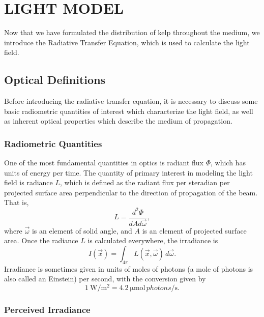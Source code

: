 \chapter{LIGHT MODEL}
\label{chap:light}

Now that we have formulated the distribution of kelp throughout the medium, we introduce the Radiative Transfer Equation, which is used to calculate the light field.

\section{Optical Definitions}
Before introducing the radiative transfer equation, it is necessary to discuss some basic radiometric quantities of interest which characterize the light field, as well as inherent optical properties which describe the medium of propagation.

\subsection{Radiometric Quantities}

One of the most fundamental quantities in optics is radiant flux $\Phi$, which has units of energy per time.
The quantity of primary interest in modeling the light field is radiance $L$, which is defined as the radiant flux per steradian per projected surface area perpendicular to the direction of propagation of the beam.
That is,
\begin{equation*}
	L = \frac{d^2\Phi}{dA d\vec{\omega}},
\end{equation*}
where $\vec{\omega}$ is an element of solid angle, and $A$ is an element of projected surface area.
Once the radiance $L$ is calculated everywhere, the irradiance is
\begin{equation*}
  I(\vec{x}) = \int_{4\pi}L(\vec{x},\vec{\omega})\, d\vec{\omega}.
\end{equation*}
Irradiance is sometimes given in units of moles of photons (a mole of photons is also called an Einstein) per second, with the conversion \cite{mobley_light_1994} given by
\begin{equation}
  \SI{1}{\W\per\m^2} = \SI{4.2}{\micro\mole \,photons\per\second}.
  \label{eqn:watts_photons}
\end{equation}

\subsection{Perceived Irradiance}
\label{sec:perceived_irrad}

